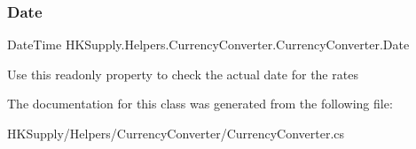 \subsubsection{\texorpdfstring{Date}{Date}}
{\footnotesize\ttfamily Date\+Time H\+K\+Supply.\+Helpers.\+Currency\+Converter.\+Currency\+Converter.\+Date\hspace{0.3cm}{\ttfamily [get]}}



Use this readonly property to check the actual date for the rates 



The documentation for this class was generated from the following file\+:\begin{DoxyCompactItemize}
\item 
H\+K\+Supply/\+Helpers/\+Currency\+Converter/Currency\+Converter.\+cs\end{DoxyCompactItemize}
